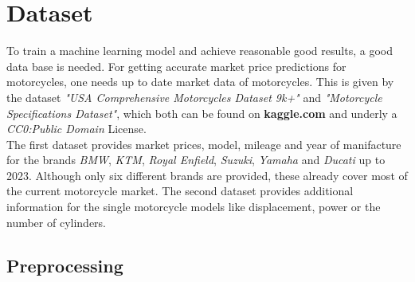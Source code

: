 \section{Dataset}
\label{sec:Dataset}

To train a machine learning model and achieve reasonable good results, a good data base is needed. For getting accurate market price predictions
for motorcycles, one needs up to date market data of motorcycles. This is given by the dataset \textit{"USA Comprehensive Motorcycles Dataset 9k+"}\cite{kaggle_1}
and \textit{"Motorcycle Specifications Dataset"}\cite{kaggle_2}, which both can be found on \textbf{kaggle.com} and underly a \textit{CC0:Public Domain} License.\\
The first dataset provides market prices, model, mileage and year of manifacture for the brands \textit{BMW}, \textit{KTM}, \textit{Royal Enfield}, \textit{Suzuki}, \textit{Yamaha} and \textit{Ducati}
up to 2023. Although only six different brands are provided, these already cover most of the current motorcycle market. The second dataset provides additional 
information for the single motorcycle models like displacement, power or the number of cylinders.

\subsection{Preprocessing}

